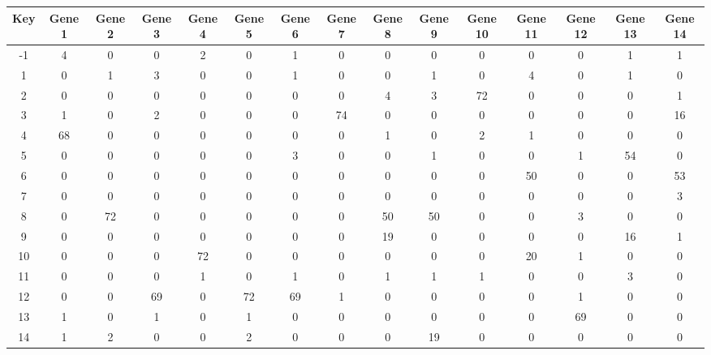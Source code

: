 \begin{tabular}{|c|c|c|c|c|c|c|c|c|c|c|c|c|c|c|}
\hline
Key & Gene 1 & Gene 2 & Gene 3 & Gene 4 & Gene 5 & Gene 6 & Gene 7 & Gene 8 & Gene 9 & Gene 10 & Gene 11 & Gene 12 & Gene 13 & Gene 14 \\
\hline
-1 & 4 & 0 & 0 & 2 & 0 & 1 & 0 & 0 & 0 & 0 & 0 & 0 & 1 & 1 \\
1 & 0 & 1 & 3 & 0 & 0 & 1 & 0 & 0 & 1 & 0 & 4 & 0 & 1 & 0 \\
2 & 0 & 0 & 0 & 0 & 0 & 0 & 0 & 4 & 3 & 72 & 0 & 0 & 0 & 1 \\
3 & 1 & 0 & 2 & 0 & 0 & 0 & 74 & 0 & 0 & 0 & 0 & 0 & 0 & 16 \\
4 & 68 & 0 & 0 & 0 & 0 & 0 & 0 & 1 & 0 & 2 & 1 & 0 & 0 & 0 \\
5 & 0 & 0 & 0 & 0 & 0 & 3 & 0 & 0 & 1 & 0 & 0 & 1 & 54 & 0 \\
6 & 0 & 0 & 0 & 0 & 0 & 0 & 0 & 0 & 0 & 0 & 50 & 0 & 0 & 53 \\
7 & 0 & 0 & 0 & 0 & 0 & 0 & 0 & 0 & 0 & 0 & 0 & 0 & 0 & 3 \\
8 & 0 & 72 & 0 & 0 & 0 & 0 & 0 & 50 & 50 & 0 & 0 & 3 & 0 & 0 \\
9 & 0 & 0 & 0 & 0 & 0 & 0 & 0 & 19 & 0 & 0 & 0 & 0 & 16 & 1 \\
10 & 0 & 0 & 0 & 72 & 0 & 0 & 0 & 0 & 0 & 0 & 20 & 1 & 0 & 0 \\
11 & 0 & 0 & 0 & 1 & 0 & 1 & 0 & 1 & 1 & 1 & 0 & 0 & 3 & 0 \\
12 & 0 & 0 & 69 & 0 & 72 & 69 & 1 & 0 & 0 & 0 & 0 & 1 & 0 & 0 \\
13 & 1 & 0 & 1 & 0 & 1 & 0 & 0 & 0 & 0 & 0 & 0 & 69 & 0 & 0 \\
14 & 1 & 2 & 0 & 0 & 2 & 0 & 0 & 0 & 19 & 0 & 0 & 0 & 0 & 0 \\
\hline
\end{tabular}